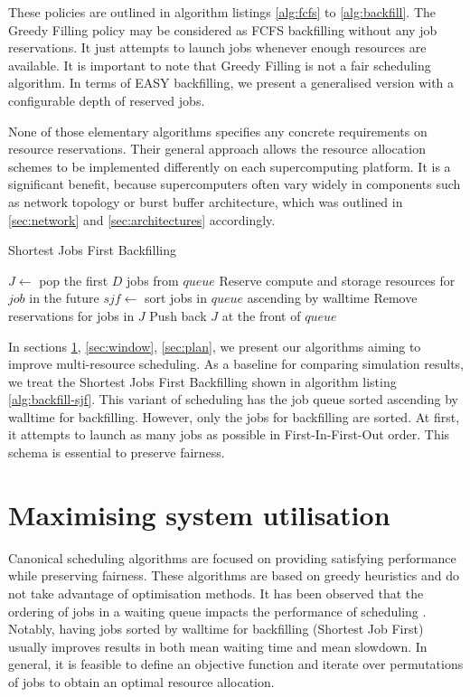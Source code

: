\documentclass[thesis-en.tex]{subfiles}
\begin{document}
These policies are outlined in algorithm listings \ref{alg:fcfs} to \ref{alg:backfill}. The Greedy Filling policy may be considered as FCFS backfilling without any job reservations. It just attempts to launch jobs whenever enough resources are available. It is important to note that Greedy Filling is not a fair scheduling algorithm. In terms of EASY backfilling, we present a generalised version with a configurable depth of reserved jobs. 

None of those elementary algorithms specifies any concrete requirements on resource reservations. Their general approach allows the resource allocation schemes to be implemented differently on each supercomputing platform. It is a significant benefit, because supercomputers often vary widely in components such as network topology or burst buffer architecture, which was outlined in \autoref{sec:network} and \autoref{sec:architectures} accordingly.

\begin{algorithm}[htb]
\caption{Shortest Jobs First Backfilling}
\label{alg:backfill-sjf}
\begin{algorithmic}[1]
  \State {}
  \State $J \gets$ pop the first $D$ jobs from $queue$
  \State Reserve compute and storage resources for $job$ in the future
  \EndFor
  \State $sjf \gets$ sort jobs in $queue$ ascending by walltime
  \State {}
  \State Remove reservations for jobs in $J$
  \State Push back $J$ at the front of $queue$
\EndProcedure
\end{algorithmic}
\end{algorithm}

In sections \ref{sec:maxutil}, \ref{sec:window}, \ref{sec:plan}, we present our algorithms aiming to improve multi-resource scheduling. As a baseline for comparing simulation results, we treat the Shortest Jobs First Backfilling shown in algorithm listing \ref{alg:backfill-sjf}. This variant of scheduling has the job queue sorted ascending by walltime for backfilling. However, only the jobs for backfilling are sorted. At first, it attempts to launch as many jobs as possible in First-In-First-Out order. This schema is essential to preserve fairness.

\section{Maximising system utilisation} \label{sec:maxutil}
Canonical scheduling algorithms are focused on providing satisfying performance while preserving fairness. These algorithms are based on greedy heuristics and do not take advantage of optimisation methods. It has been observed that the ordering of jobs in a waiting queue impacts the performance of scheduling \cite{srinivasan2002selective}. Notably, having jobs sorted by walltime for backfilling (Shortest Job First) usually improves results in both mean waiting time and mean slowdown. In general, it is feasible to define an objective function and iterate over permutations of jobs to obtain an optimal resource allocation.
\end{document}
